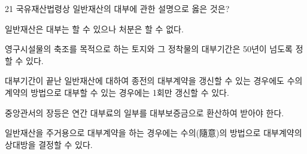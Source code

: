 \begin{question}{21}
국유재산법령상 일반재산의 대부에 관한 설명으로 옳은 것은?
\begin{choices}
  \item 일반재산은 대부는 할 수 있으나 처분은 할 수 없다.
  \item 영구시설물의 축조를 목적으로 하는 토지와 그 정착물의 대부기간은 50년이 넘도록 정할 수 있다.
  \item 대부기간이 끝난 일반재산에 대하여 종전의 대부계약을 갱신할 수 있는 경우에도 수의계약의 방법으로 대부할 수 있는 경우에는 1회만 갱신할 수 있다.
  \item 중앙관서의 장등은 연간 대부료의 일부를 대부보증금으로 환산하여 받아야 한다.
  \item 일반재산을 주거용으로 대부계약을 하는 경우에는 수의(隨意)의 방법으로 대부계약의 상대방을 결정할 수 있다.
\end{choices}
\end{question}

